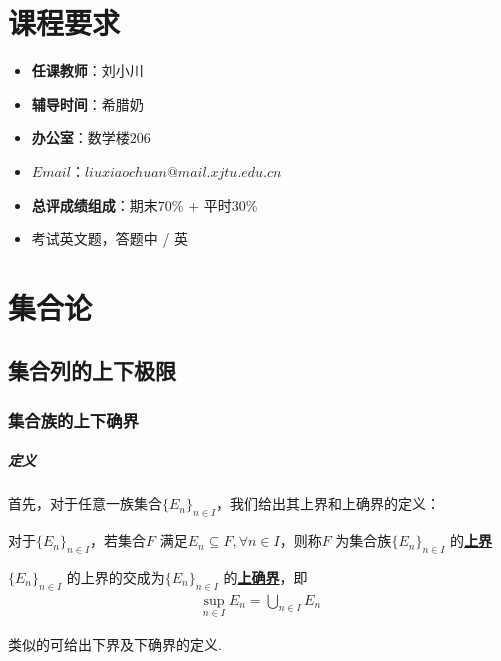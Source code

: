 \ifx\allfiles\undefined


	\else
	\fi
\chapter{课程要求}
	\begin{itemize}
		\item \textbf{任课教师}：刘小川
		
		\item \textbf{辅导时间}：希腊奶
		
		\item \textbf{办公室}：数学楼$206$
		
		\item \textbf{$Email$}：$liuxiaochuan@mail.xjtu.edu.cn$
		
		\item \textbf{总评成绩组成}：期末$70\%$ + 平时$30\%$
		
		\item 考试英文题，答题中 / 英
	\end{itemize}

\chapter{集合论}

\section{集合列的上下极限}

\subsection{集合族的上下确界}
\paragraph{定义}
	首先，对于任意一族集合$\{ E_n \}_{n \in I}$，我们给出其上界和上确界的定义：
	\begin{defn}\label{def 1.1.1}
		对于$\{ E_n \}_{n \in I}$，若集合$F$ 满足$E_n \subseteq F , \forall n \in I$，则称$F$ 为集合族$\{ E_n \}_{n \in I}$ 的\underline{\textbf{上界}}
	\end{defn}

	\begin{defn}\label{def 1.1.2}
		$\{ E_n \}_{n \in I}$ 的上界的交成为$\{ E_n \}_{n \in I}$ 的\underline{\textbf{上确界}}，即
		\begin{align}
			\sup_{n \in I}{E_n} = \bigcup_{n \in I}{E_n}
		\end{align}
	\end{defn}
	类似的可给出下界及下确界的定义.\\
	

